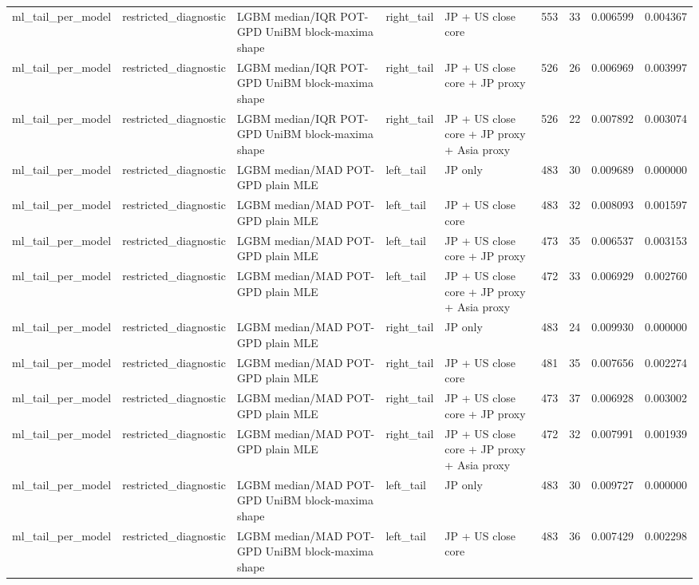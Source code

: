 \begin{tabular}{lllllrrrr}
ml\_tail\_per\_model & restricted\_diagnostic & LGBM median/IQR POT-GPD UniBM block-maxima shape & right\_tail & JP + US close core & 553 & 33 & 0.006599 & 0.004367 \\
ml\_tail\_per\_model & restricted\_diagnostic & LGBM median/IQR POT-GPD UniBM block-maxima shape & right\_tail & JP + US close core + JP proxy & 526 & 26 & 0.006969 & 0.003997 \\
ml\_tail\_per\_model & restricted\_diagnostic & LGBM median/IQR POT-GPD UniBM block-maxima shape & right\_tail & JP + US close core + JP proxy + Asia proxy & 526 & 22 & 0.007892 & 0.003074 \\
ml\_tail\_per\_model & restricted\_diagnostic & LGBM median/MAD POT-GPD plain MLE & left\_tail & JP only & 483 & 30 & 0.009689 & 0.000000 \\
ml\_tail\_per\_model & restricted\_diagnostic & LGBM median/MAD POT-GPD plain MLE & left\_tail & JP + US close core & 483 & 32 & 0.008093 & 0.001597 \\
ml\_tail\_per\_model & restricted\_diagnostic & LGBM median/MAD POT-GPD plain MLE & left\_tail & JP + US close core + JP proxy & 473 & 35 & 0.006537 & 0.003153 \\
ml\_tail\_per\_model & restricted\_diagnostic & LGBM median/MAD POT-GPD plain MLE & left\_tail & JP + US close core + JP proxy + Asia proxy & 472 & 33 & 0.006929 & 0.002760 \\
ml\_tail\_per\_model & restricted\_diagnostic & LGBM median/MAD POT-GPD plain MLE & right\_tail & JP only & 483 & 24 & 0.009930 & 0.000000 \\
ml\_tail\_per\_model & restricted\_diagnostic & LGBM median/MAD POT-GPD plain MLE & right\_tail & JP + US close core & 481 & 35 & 0.007656 & 0.002274 \\
ml\_tail\_per\_model & restricted\_diagnostic & LGBM median/MAD POT-GPD plain MLE & right\_tail & JP + US close core + JP proxy & 473 & 37 & 0.006928 & 0.003002 \\
ml\_tail\_per\_model & restricted\_diagnostic & LGBM median/MAD POT-GPD plain MLE & right\_tail & JP + US close core + JP proxy + Asia proxy & 472 & 32 & 0.007991 & 0.001939 \\
ml\_tail\_per\_model & restricted\_diagnostic & LGBM median/MAD POT-GPD UniBM block-maxima shape & left\_tail & JP only & 483 & 30 & 0.009727 & 0.000000 \\
ml\_tail\_per\_model & restricted\_diagnostic & LGBM median/MAD POT-GPD UniBM block-maxima shape & left\_tail & JP + US close core & 483 & 36 & 0.007429 & 0.002298 \\

\end{tabular}
